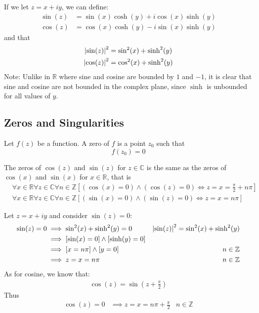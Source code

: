\documentclass[12pt, english]{book}
\makeatletter
\renewenvironment{proof}[1][\proofname]{\par
	\pushQED{\qed}%
	\normalfont \topsep6\p@\@plus6\p@\relax
	\list{}{%
		\settowidth{\leftmargin}{\itshape\proofname:\hskip\labelsep}%
		\setlength{\labelwidth}{0pt}%
		\setlength{\itemindent}{-\leftmargin}%
		}%
	\item[\hskip\labelsep\itshape#1\@addpunct{:}]\ignorespaces
	}{\popQED\endlist\@endpefalse}
\makeatother
\begin{document}
	If we let \(z = x + iy\), we can define:
	\begin{align*}
		\sin(z) &= \sin(x) \cosh(y) + i\cos(x) \sinh(y) \\
		\cos(z) &= \cos(x) \cosh(y) - i\sin(x) \sinh(y)
	\end{align*}
	and that 
	\begin{align*}
		\abs{\sin(z)}^2 &= \sin[2](x) + \sinh[2](y)\\
		\abs{\cos(z)}^2 &= \cos[2](x) + \sinh[2](y)
	\end{align*}
	Note: Unlike in \(\mathbb{R}\) where sine and cosine are bounded by \(1\) and \(-1\), 
	it is clear that sine and cosine are not bounded in the complex plane, since \(\sinh\) is unbounded for all values of \(y\). 
	
	\subsection{Zeros and Singularities} \label{Zeros and Singularities (Trig) Subsection - Complex}
	
	\begin{definition}
		\label{Zero (function) Definition - Complex}
		Let \(f(z)\) be a function. A zero of \(f\) is a point \(z_0\) such that 
		\[f(z_0) = 0\]
	\end{definition}
	
	\begin{theorem}
		The zeros of \(\cos(z)\) and \(\sin(z)\) for \(z \in \mathbb{C}\) is the same as the zeros of \(\cos(x)\) and \(\sin(x)\) for \(x \in \mathbb{R}\), that is 
		\begin{align*}
			&\forall x \in \mathbb{R} \forall z \in \mathbb{C} \forall n \in \mathbb{Z}
			\left[(\cos(x) = 0) \land (\cos(z) = 0) \iff z = x = \frac{\pi}{2} + n \pi \right] \\
			&\forall x \in \mathbb{R} \forall z \in \mathbb{C} \forall n \in \mathbb{Z}
			\left[(\sin(x) = 0) \land (\sin(z) = 0) \iff z = x = n\pi \right]
		\end{align*}
	\end{theorem}	
	\begin{proof}
		Let \(z = x + iy\) and consider \(\sin(z) = 0\):
		\begin{align*}
			\sin(z) = 0 
			&\implies \sin[2](x) + \sinh[2](y) = 0 & \abs{\sin(z)}^2 = \sin[2](x) + \sinh[2](y) \\
			&\implies [\sin(x) = 0] \land [\sinh(y) = 0] \\
			&\implies [x = n\pi] \land [y = 0] & n \in \mathbb{Z}\\
			&\implies z = x = n \pi & n \in \mathbb{Z}
		\end{align*}
		As for cosine, we know that:
		\begin{align*}
			\cos(z) = \sin \left(z + \frac{\pi}{2}\right)
		\end{align*}
		Thus
		\begin{align*}
			\cos(z) = 0 &\implies z = x = n \pi + \frac{\pi}{2} & n \in \mathbb{Z}
		\end{align*}
	\end{proof}
\end{document}
